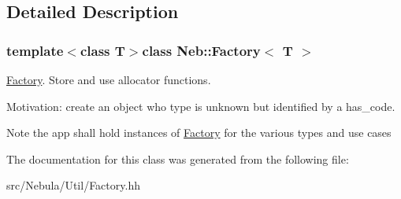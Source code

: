 \subsection{Detailed Description}
\subsubsection*{template$<$class T$>$class Neb\-::\-Factory$<$ T $>$}

\hyperlink{classNeb_1_1Factory}{Factory}. Store and use allocator functions. 

\begin{DoxyParagraph}{Motivation\-:}
create an object who type is unknown but identified by a has\-\_\-code.
\end{DoxyParagraph}
\begin{DoxyNote}{Note}
the app shall hold instances of \hyperlink{classNeb_1_1Factory}{Factory} for the various types and use cases 
\end{DoxyNote}


The documentation for this class was generated from the following file\-:\begin{DoxyCompactItemize}
\item 
src/\-Nebula/\-Util/Factory.\-hh\end{DoxyCompactItemize}
